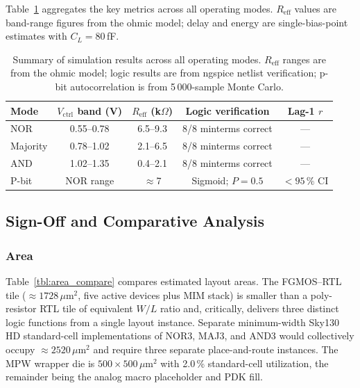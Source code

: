 \documentclass[a4paper,fleqn]{cas-sc}
\newcommand{\Vctrl}{V_{\mathrm{ctrl}}}
\newcommand{\Reff}{R_{\mathrm{eff}}}
\newcommand{\CL}{C_{L}}
\begin{document}
Table~\ref{tbl:summary} aggregates the key metrics across all operating modes.
$R_{\mathrm{eff}}$ values are band-range figures from the ohmic model; delay and energy
are single-bias-point estimates with $\CL = 80$\,fF.

\begin{table}[htb]
\centering
\caption{Summary of simulation results across all operating modes. $\Reff$ ranges
are from the ohmic model; logic results are from ngspice netlist verification;
p-bit autocorrelation is from 5\,000-sample Monte Carlo.}
\label{tbl:summary}
\setlength{\tabcolsep}{5pt}
\begin{tabular}{@{}lcccc@{}}
\toprule
Mode     & $\Vctrl$ band (V) & $\Reff$ (k$\Omega$) & Logic verification & Lag-1 $r$ \\
\midrule
NOR      & 0.55--0.78 & 6.5--9.3   & 8/8 minterms correct & ---           \\
Majority & 0.78--1.02 & 2.1--6.5   & 8/8 minterms correct & ---           \\
AND      & 1.02--1.35 & 0.4--2.1   & 8/8 minterms correct & ---           \\
P-bit    & NOR range  & $\approx$7 & Sigmoid; $P{=}0.5$   & $<95\,\%$ CI  \\
\bottomrule
\end{tabular}
\end{table}

\subsection{Sign-Off and Comparative Analysis}
\label{sec:signoff}

\subsubsection{Area}

Table~\ref{tbl:area_compare} compares estimated layout areas. The FGMOS--RTL tile
($\approx 1728\,\mu\mathrm{m}^2$, five active devices plus MIM stack) is smaller than a
poly-resistor RTL tile of equivalent $W/L$ ratio and, critically, delivers three
distinct logic functions from a single layout instance. Separate minimum-width Sky130 HD
standard-cell implementations of NOR3, MAJ3, and AND3 would collectively occupy
$\approx 2520\,\mu\mathrm{m}^2$ and require three separate place-and-route instances.
The MPW wrapper die is $500 \times 500\,\mu\mathrm{m}^2$ with 2.0\,\% standard-cell
utilization, the remainder being the analog macro placeholder and PDK fill.
\end{document}
